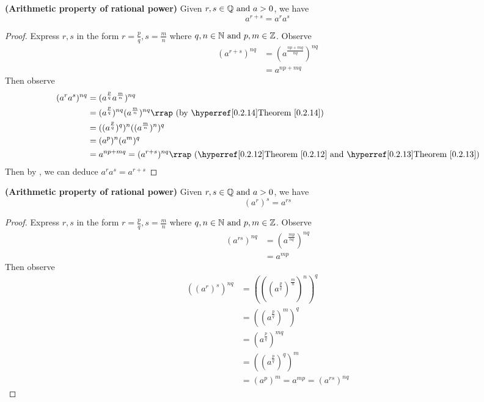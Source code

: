 \documentclass{report}
\begin{document}
\begin{theorem}
\label{1.3.12}
 \textbf{(Arithmetic property of rational power)} Given $r,s\in\mathbb{Q}\text{ and }a>0$, we have
\begin{equation}
a^{r+s}=a^ra^s
\end{equation}
\end{theorem}
\begin{proof}
Express $r,s$ in the form $r=\frac{p}{q},s=\frac{m}{n}$ where $q,n\in\mathbb{N}\text{ and }p,m \in\mathbb{Z}$. Observe
\begin{align}
  (a^{r+s})^{nq}&=(a^{\frac{np+mq}{nq}})^{nq}\\
  &=a^{np+mq} 
\end{align}
Then observe
\begin{align}
  (a^ra^s)^{nq}&= (a^{\frac{p}{q}}a^{\frac{m}{n}})^{nq} \\
  &= (a^{\frac{p}{q}})^{nq}(a^{\frac{m}{n}})^{nq}\rap{by \myref{Theorem}{0.2.14}}\\
  &=((a^{\frac{p}{q}})^q)^n((a^{\frac{m}{n}})^n)^q\\
&=(a^p)^n(a^m)^q\\
&= a^{np+mq}=(a^{r+s})^{nq}\rap{\myref{Theorem}{0.2.12}\text{ and }\myref{Theorem}{0.2.13}} 
\end{align}
Then by , we can deduce $a^ra^s=a^{r+s}$ 
\end{proof}
\begin{theorem}
\label{1.3.13}
\textbf{(Arithmetic property of rational power)} Given $r,s\in\mathbb{Q}\text{ and }a>0$, we have
\begin{equation}
  (a^r)^s=a^{rs}
\end{equation}
\end{theorem}
\begin{proof}
Express $r,s$ in the form $r=\frac{p}{q},s=\frac{m}{n}$ where $q,n\in\mathbb{N}\text{ and }p,m \in\mathbb{Z}$. Observe
\begin{align}
  (a^{rs})^{nq}&=(a^{\frac{mp}{nq}})^{nq}\\
  &= a^{mp}
\end{align}
Then observe
\begin{align}
  ((a^r)^s)^{nq}&=(((a^{\frac{p}{q}})^{\frac{m}{n}})^n)^q\\
  &=((a^{\frac{p}{q}})^m)^q\\
 &=(a^{\frac{p}{q}})^{mq}\\
  &=((a^{\frac{p}{q}})^q)^m \\
  &=(a^p)^m=a^{mp}=(a^{rs})^{nq}  
\end{align}
\end{proof}
\end{document}
